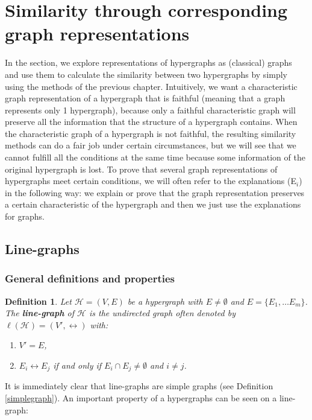 \documentclass[a4paper,11pt]{report}
\newtheorem{definition}[theorem]{Definition}
\newcommand{\hgrafeen}{\mathcal{H}}
\begin{document}
   

\newpage
\section{Similarity through corresponding graph representations}
In the section, we explore representations of hypergraphs as (classical) graphs and use 
them to calculate the similarity between two hypergraphs by simply using the 
methods of the previous chapter. Intuitively, we want a characteristic graph
representation of a hypergraph that is faithful (meaning that a graph represents
only 1 hypergraph), because only a faithful
characteristic graph will preserve all the information that the structure of a hypergraph
contains. When the characteristic graph of a hypergraph is not faithful,
the resulting similarity methods 
can do a fair job under certain circumstances, but we will see that we cannot fulfill
all the conditions at the same time because some information of the original hypergraph is lost. 
To prove that several graph representations of hypergraphs meet certain 
conditions, we will often refer to the explanations (E$_i$) in the following 
way: we explain or prove that the graph representation preserves a certain 
characteristic of the hypergraph and then we just use the explanations for 
graphs. 

\subsection{Line-graphs}
\subsubsection{General definitions and properties}
\begin{definition}\label{linegraphdef}
  Let $\hgrafeen = (V,E)$ be a hypergraph with $E \not = \emptyset$ and $E = \{E_1, \ldots E_m\}$. The \textbf{line-graph} of $\hgrafeen$ is the undirected graph 
  often denoted by $\ell(\hgrafeen) = (V', \leftrightarrow)$ 
with:
  \begin{enumerate}
    \item $V' = E$,
    \item $E_i \leftrightarrow E_j$ if and only if $E_i \cap E_j \not = \emptyset$ and $i \not = j$.
      \end{enumerate}
\end{definition}

It is immediately clear that line-graphs are simple graphs (see Definition \ref{simplegraph}). 
An important property of a hypergraphs can be seen on a line-graph:
\end{document}
